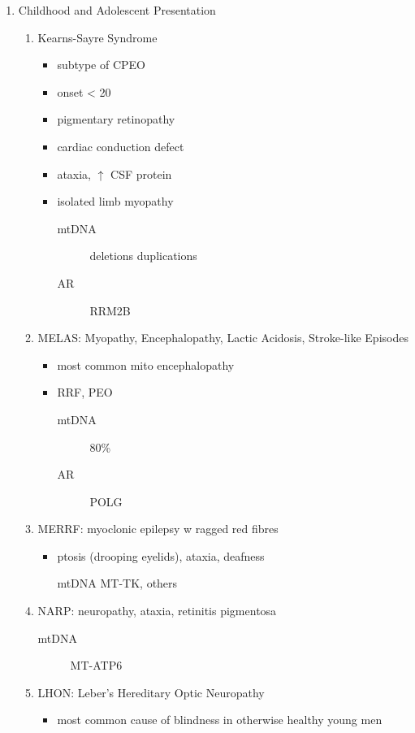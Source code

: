 \documentclass{scrartcl}
\begin{document}
\begin{enumerate}
\item Childhood and Adolescent Presentation
\label{sec:org2dd79db}
\begin{enumerate}
\item Kearns-Sayre Syndrome
\label{sec:orgdaa5edf}
\begin{itemize}
\item subtype of CPEO
\item onset \textless{} 20
\item pigmentary retinopathy
\item cardiac conduction defect
\item ataxia, \(\uparrow\) CSF protein
\item isolated limb myopathy
\begin{description}
\item[{mtDNA}] deletions \textpm{} duplications
\item[{AR}] RRM2B
\end{description}
\end{itemize}
\item MELAS: Myopathy, Encephalopathy, Lactic Acidosis, Stroke-like Episodes
\label{sec:orga92237d}
\begin{itemize}
\item most common mito encephalopathy
\item RRF, PEO
\begin{description}
\item[{mtDNA}] 80\%
\item[{AR}] POLG
\end{description}
\end{itemize}
\item MERRF: myoclonic epilepsy w ragged red fibres
\label{sec:orgbf4fea9}
\begin{itemize}
\item ptosis (drooping eyelids), ataxia, deafness
\item[{mtDNA}] MT-TK, others
\end{itemize}
\item NARP: neuropathy, ataxia, retinitis pigmentosa
\label{sec:org7a3227f}
\begin{description}
\item[{mtDNA}] MT-ATP6
\end{description}
\item LHON: Leber’s Hereditary Optic Neuropathy
\label{sec:orgdf478d0}
\begin{itemize}
\item most common cause of blindness in otherwise healthy young men

\end{itemize}
\end{enumerate}
\end{enumerate}
\end{document}
